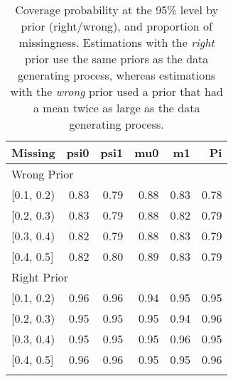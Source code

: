 \begin{table}[ht]
\centering
\begin{tabular}{lrrrrr}
  \toprule
Missing & psi0 & psi1 & mu0 & m1 & Pi \\ 
  \midrule
\multicolumn{6}{l}{Wrong Prior}\\
{[0.1, 0.2)} & 0.83 & 0.79 & 0.88 & 0.83 & 0.78 \\ 
  {[0.2, 0.3)} & 0.83 & 0.79 & 0.88 & 0.82 & 0.79 \\ 
  {[0.3, 0.4)} & 0.82 & 0.79 & 0.88 & 0.83 & 0.79 \\ 
  {[0.4, 0.5]} & 0.82 & 0.80 & 0.89 & 0.83 & 0.79 \\ 
   \midrule
\multicolumn{6}{l}{Right Prior}\\
{[0.1, 0.2)} & 0.96 & 0.96 & 0.94 & 0.95 & 0.95 \\ 
  {[0.2, 0.3)} & 0.95 & 0.95 & 0.95 & 0.94 & 0.96 \\ 
  {[0.3, 0.4)} & 0.95 & 0.95 & 0.95 & 0.96 & 0.95 \\ 
  {[0.4, 0.5]} & 0.96 & 0.96 & 0.95 & 0.95 & 0.96 \\ 
   \bottomrule
\multicolumn{6}{l}{}\\
\end{tabular}
\caption{Coverage probability at the 95\% level by prior (right/wrong), and proportion of missingness. Estimations with the \emph{right} prior use the same priors as the data generating process, whereas estimations with the \emph{wrong} prior used a prior that had a mean twice as large as the data generating process.} 
\label{tab:coverage95-method-missigness}
\end{table}
